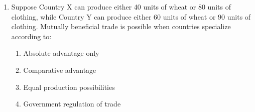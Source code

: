 \documentclass[12pt]{article}
\begin{document}
\begin{enumerate}
    \item Suppose Country X can produce either 40 units of wheat or 80 units of clothing, while Country Y can produce either 60 units of wheat or 90 units of clothing. Mutually beneficial trade is possible when countries specialize according to:
    \begin{enumerate}[label=\Alph*.]
        \item Absolute advantage only
        \item Comparative advantage
        \item Equal production possibilities
        \item Government regulation of trade
    \end{enumerate}

\end{enumerate}
\end{document}
